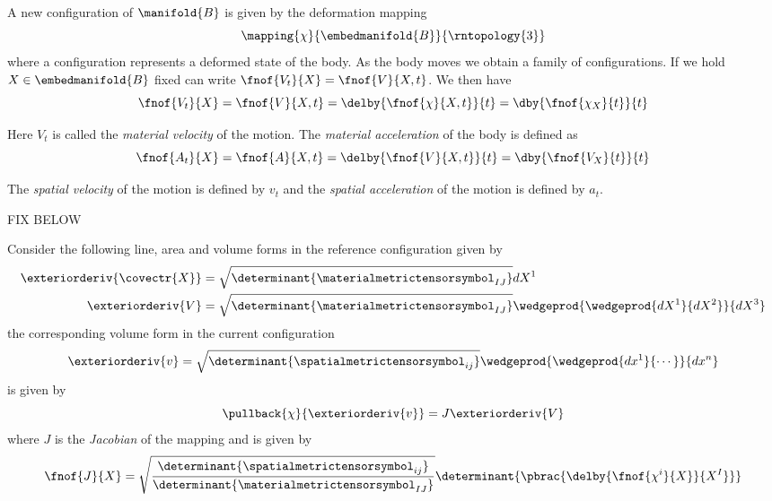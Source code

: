 A new configuration of $\manifold{B}$ is given by the deformation mapping
\begin{equation}
  \mapping{\chi}{\embedmanifold{B}}{\rntopology{3}}
\end{equation}
where a configuration represents a deformed state of the body. As the body
moves we obtain a family of configurations. If we hold $X\in\embedmanifold{B}$
fixed can write $\fnof{V_{t}}{X}=\fnof{V}{X,t}$. We then have
\begin{equation}
  \fnof{V_{t}}{X}=\fnof{V}{X,t}=\delby{\fnof{\chi}{X,t}}{t}=\dby{\fnof{\chi_{X}}{t}}{t}
\end{equation}

Here $V_{t}$ is called the \emph{material velocity} of the motion. The
\emph{material acceleration} of the body is defined as
\begin{equation}
  \fnof{A_{t}}{X}=\fnof{A}{X,t}=\delby{\fnof{V}{X,t}}{t}=\dby{\fnof{V_{X}}{t}}{t}
\end{equation}

The \emph{spatial velocity} of the motion is defined by $v_{t}$ and the
\emph{spatial acceleration} of the motion is defined by $a_{t}$.

FIX BELOW

Consider the following line, area and volume forms in the reference configuration given by
\begin{align}
  \exteriorderiv{\covectr{X}}&=\sqrt{\determinant{\materialmetrictensorsymbol_{IJ}}}dX^{1} \\
  \exteriorderiv{V}&=\sqrt{\determinant{\materialmetrictensorsymbol_{IJ}}}\wedgeprod{\wedgeprod{dX^{1}}{dX^{2}}}{dX^{3}}
\end{align}
the corresponding volume form in the current configuration
\begin{equation}
  \exteriorderiv{v}=\sqrt{\determinant{\spatialmetrictensorsymbol_{ij}}}\wedgeprod{\wedgeprod{dx^{1}}{\cdots}}{dx^{n}}
\end{equation}
is given by
\begin{equation}
  \pullback{\chi}{\exteriorderiv{v}}=J\exteriorderiv{V}
\end{equation}
where $J$ is the \emph{Jacobian} of the mapping and is given by
\begin{equation}
  \fnof{J}{X}=\sqrt{\dfrac{\determinant{\spatialmetrictensorsymbol_{ij}}}{\determinant{\materialmetrictensorsymbol_{IJ}}}}\determinant{\pbrac{\delby{\fnof{\chi^{i}}{X}}{X^{I}}}}
\end{equation}

